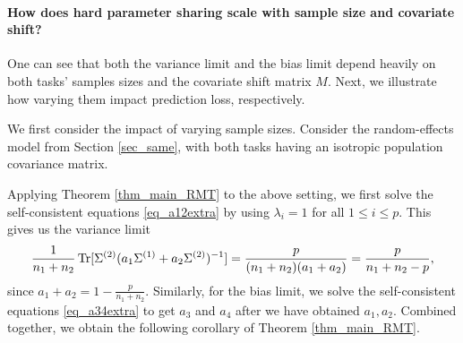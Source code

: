 \paragraph{How does hard parameter sharing scale with sample size and covariate shift?}
One can see that both the variance limit and the bias limit depend heavily on both tasks' samples sizes and the covariate shift matrix $M$.
Next, we illustrate how varying them impact prediction loss, respectively.
\begin{example}\label{ex_sample_ratio}
	We first consider the impact of varying sample sizes.
	Consider the random-effects model from Section \ref{sec_same}, with both tasks having an isotropic population covariance matrix.

	Applying Theorem \ref{thm_main_RMT} to the above setting, we first solve the self-consistent equations \eqref{eq_a12extra} by using $\lambda_i = 1$ for all $1\le i\le p$.
	This gives us the variance limit
	\[ \frac{1}{n_1 + n_2} \operatorname{Tr}[\Sigma^{(2)} (a_1\Sigma^{(1)} + a_2\Sigma^{(2)})^{-1}] = \frac{p}{(n_1 + n_2)(a_1 + a_2)} = \frac{p}{n_1 + n_2 - p}, \]
	since $a_1 + a_2 = 1 - \frac{p}{n_1 + n_2}$.
	Similarly, for the bias limit, we solve the self-consistent equations \eqref{eq_a34extra} to get $a_3$ and $a_4$ after we have obtained $a_1, a_2$.
	Combined together, we obtain the following corollary of Theorem \ref{thm_main_RMT}.
\end{example}

